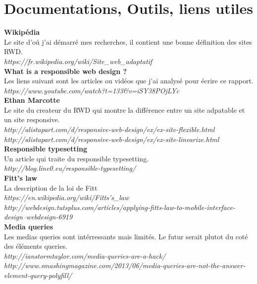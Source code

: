 \documentclass{article}
\begin{document}
\par

\newpage
\section{Documentations, Outils, liens utiles} 

\textbf{Wikip\'edia}\\
Le site d'o\'u j'ai d\'emarr\'e mes recherches, il contient une bonne d\'efinition des sites RWD.\\
\textit{https://fr.wikipedia.org/wiki/Site\_web\_adaptatif}
\vspace{0.5cm}\\
\textbf{What is a responsible web design ?}\\
Les liens suivant sont les articles ou vid\'eos que j'ai analys\'e pour \'ecrire ce rapport.\\
\textit{https://www.youtube.com/watch?t=133\&v=iSY38POjLYc}
\vspace{0.5cm}\\
\textbf{Ethan Marcotte}\\
Le site du createur du RWD qui montre la diff\'erence entre un site adpatable et un site responsive.\\
\textit{http://alistapart.com/d/responsive-web-design/ex/ex-site-flexible.html}\\
\textit{http://alistapart.com/d/responsive-web-design/ex/ex-site-linearize.html}
\vspace{0.5cm}\\
\textbf{Responsible typesetting}\\
Un article qui traite du responsible typesetting.\\
\textit{http://blog.line0.eu/responsible-typesetting/}
\vspace{0.5cm}\\
\textbf{Fitt's law}\\
La description de la loi de Fitt\\
\textit{https://en.wikipedia.org/wiki/Fitts's\_law}\\
\textit{http://webdesign.tutsplus.com/articles/applying-fitts-law-to-mobile-interface-design--webdesign-6919}
\vspace{0.5cm}\\
\textbf{Media queries}\\
Les medias queries sont int\'erressants mais limit\'es. Le futur serait plutot du cot\'e des \'el\'ements queries.\\
\textit{http://ianstormtaylor.com/media-queries-are-a-hack/}\\
\textit{http://www.smashingmagazine.com/2013/06/media-queries-are-not-the-answer-element-query-polyfill/}\\
\end{document}
